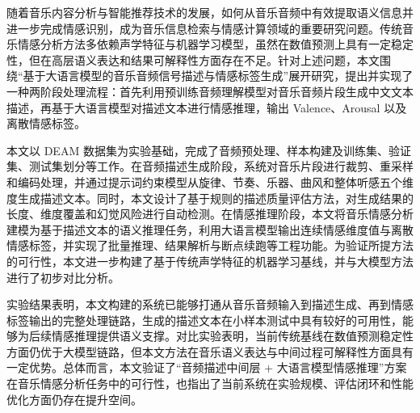 

\begin{abstractcn}
随着音乐内容分析与智能推荐技术的发展，如何从音乐音频中有效提取语义信息并进一步完成情感识别，成为音乐信息检索与情感计算领域的重要研究问题。传统音乐情感分析方法多依赖声学特征与机器学习模型，虽然在数值预测上具有一定稳定性，但在高层语义表达和结果可解释性方面存在不足。针对上述问题，本文围绕“基于大语言模型的音乐音频信号描述与情感标签生成”展开研究，提出并实现了一种两阶段处理流程：首先利用预训练音频理解模型对音乐音频片段生成中文文本描述，再基于大语言模型对描述文本进行情感推理，输出 Valence、Arousal 以及离散情感标签。

本文以 DEAM 数据集为实验基础，完成了音频预处理、样本构建及训练集、验证集、测试集划分等工作。在音频描述生成阶段，系统对音乐片段进行裁剪、重采样和编码处理，并通过提示词约束模型从旋律、节奏、乐器、曲风和整体听感五个维度生成描述文本。同时，本文设计了基于规则的描述质量评估方法，对生成结果的长度、维度覆盖和幻觉风险进行自动检测。在情感推理阶段，本文将音乐情感分析建模为基于描述文本的语义推理任务，利用大语言模型输出连续情感维度值与离散情感标签，并实现了批量推理、结果解析与断点续跑等工程功能。为验证所提方法的可行性，本文进一步构建了基于传统声学特征的机器学习基线，并与大模型方法进行了初步对比分析。

实验结果表明，本文构建的系统已能够打通从音乐音频输入到描述生成、再到情感标签输出的完整处理链路，生成的描述文本在小样本测试中具有较好的可用性，能够为后续情感推理提供语义支撑。对比实验表明，当前传统基线在数值预测稳定性方面仍优于大模型链路，但本文方法在音乐语义表达与中间过程可解释性方面具有一定优势。总体而言，本文验证了“音频描述中间层 + 大语言模型情感推理”方案在音乐情感分析任务中的可行性，也指出了当前系统在实验规模、评估闭环和性能优化方面仍存在提升空间。
\end{abstractcn}

